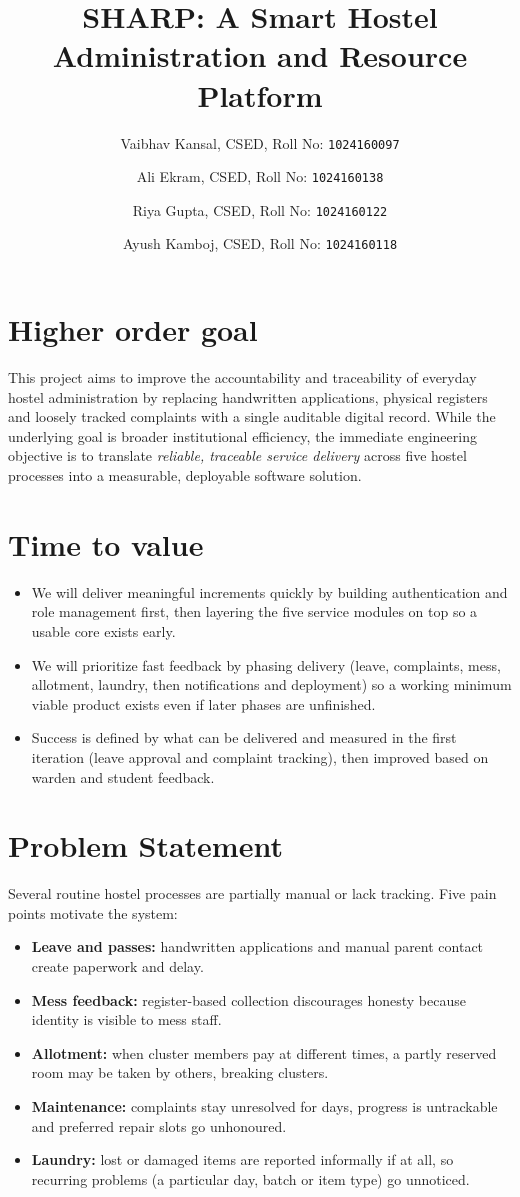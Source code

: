 \documentclass[11pt,a4paper]{article}
\title{SHARP: A Smart Hostel Administration and Resource Platform}
\author{
  Vaibhav Kansal, CSED, Roll No: \texttt{1024160097}
  \and
  Ali Ekram, CSED, Roll No: \texttt{1024160138}
  \and
  Riya Gupta, CSED, Roll No: \texttt{1024160122}
  \and
  Ayush Kamboj, CSED, Roll No: \texttt{1024160118}
}
\begin{document}
\maketitle

\section{Higher order goal}
This project aims to improve the accountability and traceability of everyday hostel
administration by replacing handwritten applications, physical registers and loosely tracked
complaints with a single auditable digital record. While the underlying goal is broader
institutional efficiency, the immediate engineering objective is to translate \emph{reliable,
traceable service delivery} across five hostel processes into a measurable, deployable
software solution.

\section{Time to value }
\begin{itemize}[leftmargin=0.7cm]
    \item We will deliver meaningful increments quickly by building authentication and role
    management first, then layering the five service modules on top so a usable core exists
    early.
    \item We will prioritize fast feedback by phasing delivery (leave,
    complaints, mess, allotment, laundry, then notifications and deployment) so a working
    minimum viable product exists even if later phases are unfinished.
    \item Success is defined by what can be delivered and measured in the first iteration
    (leave approval and complaint tracking), then improved based on warden and student
    feedback.
\end{itemize}

\section{Problem Statement}
Several routine hostel processes are partially manual or lack tracking. Five pain points
motivate the system:
\begin{itemize}[leftmargin=0.7cm]
    \item \textbf{Leave and passes:} handwritten applications and manual parent contact create
    paperwork and delay.
    \item \textbf{Mess feedback:} register-based collection discourages honesty because
    identity is visible to mess staff.
    \item \textbf{Allotment:} when cluster members pay at different times, a partly reserved
    room may be taken by others, breaking clusters.
    \item \textbf{Maintenance:} complaints stay unresolved for days, progress is untrackable
    and preferred repair slots go unhonoured.
    \item \textbf{Laundry:} lost or damaged items are reported informally if at all, so
    recurring problems (a particular day, batch or item type) go unnoticed.
\end{itemize}
\end{document}
